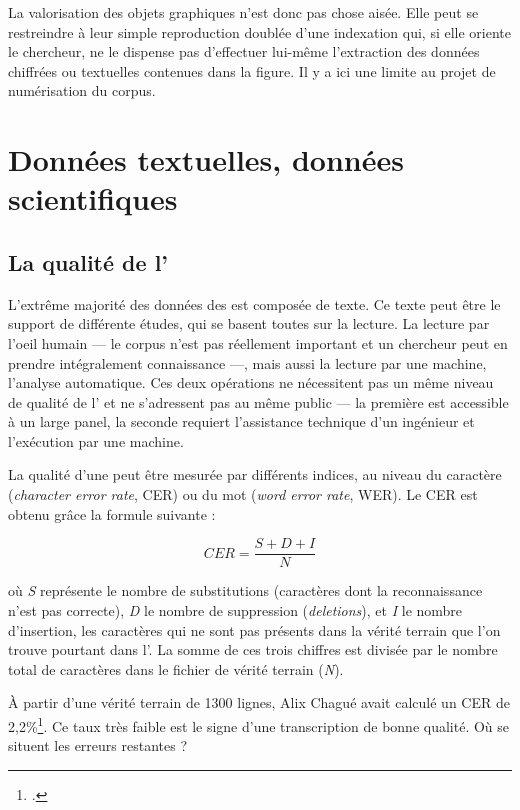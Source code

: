 La valorisation des objets graphiques n'est donc pas chose aisée. Elle peut se restreindre à leur simple reproduction doublée d'une indexation qui, si elle oriente le chercheur, ne le dispense pas d'effectuer lui-même l'extraction des données chiffrées ou textuelles contenues dans la figure. Il y a ici une limite au projet de numérisation du corpus.

\chapter{Données textuelles, données scientifiques}

\section{La qualité de l'\ocr}

L'extrême majorité des données des \odm{} est composée de texte. Ce texte peut être le support de différente études, qui se basent toutes sur la lecture. La lecture par l'oeil humain --- le corpus n'est pas réellement important et un chercheur peut en prendre intégralement connaissance ---, mais aussi la lecture par une machine, \cad{} l'analyse automatique. Ces deux opérations ne nécessitent pas un même niveau de qualité de l'\ocr{} et ne s'adressent pas au même public --- la première est accessible à un large panel, la seconde requiert l'assistance technique d'un ingénieur et l'exécution par une machine.

La qualité d'une \ocr{} peut être mesurée par différents indices, au niveau du caractère (\textit{character error rate}, CER) ou du mot (\textit{word error rate}, WER).  Le CER est obtenu grâce la formule suivante :

\[CER = \frac{S + D + I}{N}\]

où \textit{S} représente le nombre de substitutions (caractères dont la reconnaissance n'est pas correcte), \textit{D} le nombre de suppression (\textit{deletions}), et \textit{I} le nombre d'insertion, \cad{} les caractères qui ne sont pas présents dans la vérité terrain que l'on trouve pourtant dans l'\ocr. La somme de ces trois chiffres est divisée par le nombre total de caractères dans le fichier de vérité terrain (\textit{N}).

À partir d'une vérité terrain de 1300 lignes, Alix Chagué avait calculé un CER de 2,2\%\footcite[slide 16]{inria-pp}. Ce taux très faible est le signe d'une transcription de bonne qualité. Où se situent les erreurs restantes ?

